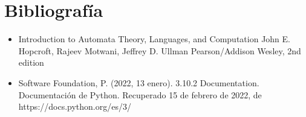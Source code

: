 \documentclass{article}
\begin{document}
\section*{Bibliograf\'ia}
\begin{itemize}
    \item Introduction to Automata Theory, Languages, and Computation
    John E. Hopcroft, Rajeev Motwani, Jeffrey D. Ullman
    Pearson/Addison Wesley, 2nd edition
    \item Software Foundation, P. (2022, 13 enero). 3.10.2 Documentation. Documentación de Python. Recuperado 15 de febrero de 2022, de https://docs.python.org/es/3/
\end{itemize}
\end{document}
